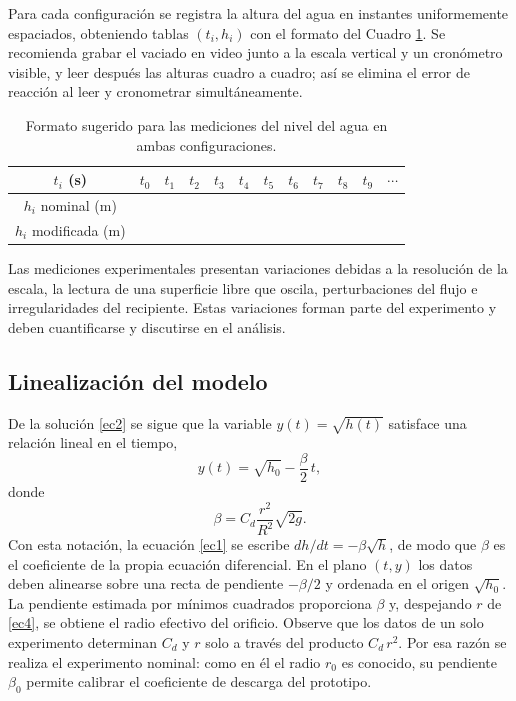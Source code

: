 \documentclass[oneside,letter,spanish,activeacute,english,links,10pt]{amcaGCS_EDO}
\begin{document}
	Para cada configuración se registra la altura del agua en instantes uniformemente espaciados, obteniendo tablas $(t_i,h_i)$ con el formato del Cuadro \ref{tab:datos_altura}. Se recomienda grabar el vaciado en video junto a la escala vertical y un cronómetro visible, y leer después las alturas cuadro a cuadro; así se elimina el error de reacción al leer y cronometrar simultáneamente.
	\begin{table}[H]
		\centering
		\small
		\setlength{\tabcolsep}{5pt}\renewcommand{\arraystretch}{1.3}
		\begin{tabular}{|c|ccccccccccc|}
			\hline
			$t_i$ (s) & $t_0$ & $t_1$ & $t_2$ & $t_3$ & $t_4$ & $t_5$ & $t_6$ & $t_7$ & $t_8$ & $t_9$ & $\cdots$ \\
			\hline
			$h_i$ nominal (m) & & & & & & & & & & & \\
			\hline
			$h_i$ modificada (m) & & & & & & & & & & & \\
			\hline
		\end{tabular}
		\caption{Formato sugerido para las mediciones del nivel del agua en ambas configuraciones.}\label{tab:datos_altura}
	\end{table}
	
	\noindent Las mediciones experimentales presentan variaciones debidas a la resolución de la escala, la lectura de una superficie libre que oscila, perturbaciones del flujo e irregularidades del recipiente. Estas variaciones forman parte del experimento y deben cuantificarse y discutirse en el análisis.
	
	\subsection{Linealización del modelo}
	De la solución \eqref{ec2} se sigue que la variable $y(t)=\sqrt{h(t)}$ satisface una relación lineal en el tiempo,
	\begin{equation}\label{ec3}
		y(t)=\sqrt{h_0}-\frac{\beta}{2}\, t ,
	\end{equation}
	donde
	\begin{equation}\label{ec4}
		\beta= C_d \frac{r^2}{R^2} \sqrt{2 g}.
	\end{equation}
	Con esta notación, la ecuación \eqref{ec1} se escribe $dh/dt=-\beta\sqrt{h}$, de modo que $\beta$ es el coeficiente de la propia ecuación diferencial. En el plano $(t,y)$ los datos deben alinearse sobre una recta de pendiente $-\beta/2$ y ordenada en el origen $\sqrt{h_0}$. La pendiente estimada por mínimos cuadrados proporciona $\beta$ y, despejando $r$ de \eqref{ec4}, se obtiene el radio efectivo del orificio. Observe que los datos de un solo experimento determinan $C_d$ y $r$ solo a través del producto $C_d\,r^2$. Por esa razón se realiza el experimento nominal: como en él el radio $r_0$ es conocido, su pendiente $\beta_0$ permite calibrar el coeficiente de descarga del prototipo.
	
\end{document}
